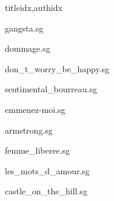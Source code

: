 \documentclass[
    fontsize=7pt
    ]{scrartcl}
\begin{document}
\begin{songs}{titleidx,authidx}

{gangsta.sg}


{dommage.sg}


{don_t_worry_be_happy.sg}


{sentimental_bourreau.sg}


{emmenez-moi.sg}


{armstrong.sg}


{femme_liberee.sg}


{les_mots_d_amour.sg}


{castle_on_the_hill.sg}



\end{songs}
\end{document}
